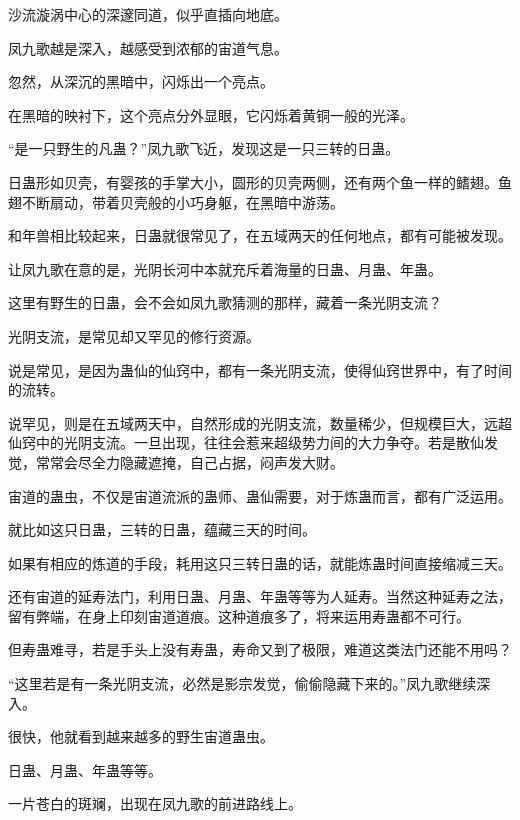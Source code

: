 
\begin{this_body}



沙流漩涡中心的深邃同道，似乎直插向地底。

凤九歌越是深入，越感受到浓郁的宙道气息。

忽然，从深沉的黑暗中，闪烁出一个亮点。

在黑暗的映衬下，这个亮点分外显眼，它闪烁着黄铜一般的光泽。

“是一只野生的凡蛊？”凤九歌飞近，发现这是一只三转的日蛊。

日蛊形如贝壳，有婴孩的手掌大小，圆形的贝壳两侧，还有两个鱼一样的鳍翅。鱼翅不断扇动，带着贝壳般的小巧身躯，在黑暗中游荡。

和年兽相比较起来，日蛊就很常见了，在五域两天的任何地点，都有可能被发现。

让凤九歌在意的是，光阴长河中本就充斥着海量的日蛊、月蛊、年蛊。

这里有野生的日蛊，会不会如凤九歌猜测的那样，藏着一条光阴支流？

光阴支流，是常见却又罕见的修行资源。

说是常见，是因为蛊仙的仙窍中，都有一条光阴支流，使得仙窍世界中，有了时间的流转。

说罕见，则是在五域两天中，自然形成的光阴支流，数量稀少，但规模巨大，远超仙窍中的光阴支流。一旦出现，往往会惹来超级势力间的大力争夺。若是散仙发觉，常常会尽全力隐藏遮掩，自己占据，闷声发大财。

宙道的蛊虫，不仅是宙道流派的蛊师、蛊仙需要，对于炼蛊而言，都有广泛运用。

就比如这只日蛊，三转的日蛊，蕴藏三天的时间。

如果有相应的炼道的手段，耗用这只三转日蛊的话，就能炼蛊时间直接缩减三天。

还有宙道的延寿法门，利用日蛊、月蛊、年蛊等等为人延寿。当然这种延寿之法，留有弊端，在身上印刻宙道道痕。这种道痕多了，将来运用寿蛊都不可行。

但寿蛊难寻，若是手头上没有寿蛊，寿命又到了极限，难道这类法门还能不用吗？

“这里若是有一条光阴支流，必然是影宗发觉，偷偷隐藏下来的。”凤九歌继续深入。

很快，他就看到越来越多的野生宙道蛊虫。

日蛊、月蛊、年蛊等等。

一片苍白的斑斓，出现在凤九歌的前进路线上。


\end{this_body}
